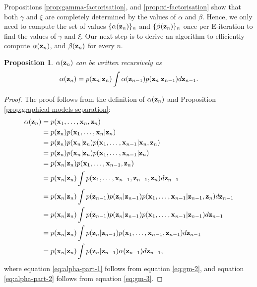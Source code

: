 \documentclass[12pt, oneside]{book}
\numberwithin{equation}{section}
\newcommand{\x}{{\bf x}}
\newcommand{\z}{{\bf z}}
\newtheorem{proposition}{Proposition}[section]
\begin{document}
{%
Propositions \ref{prop:gamma-factorisation}, and \ref{prop:xi-factorisation} show that both $\gamma$ and $\xi$ are completely determined by the values of $\alpha$ and $\beta$. Hence, we only need to compute the set of values $\{\alpha(\z_n)\}_n$ and $\{\beta(\z_n)\}_n$ once per E-iteration to find the values of $\gamma$ and $\xi$. Our next step is to derive an algorithm to efficiently compute $\alpha(\z_n)$, and $\beta(\z_n)$ for every $n$.


\begin{proposition} \label{prop:alpha-recursive}
	$\alpha(\z_n)$ can be written recursively as
	\begin{equation}
		\alpha(\z_n) = p(\x_n\vert \z_n) \int \alpha(\z_{n-1})p(\z_n\vert\z_{n-1}) d\z_{n-1}.
	\end{equation}
\end{proposition}

\begin{proof}
	The proof follows from the definition of $\alpha(\z_n)$ and Proposition \ref{prop:graphical-models-separation}:
	\begin{align}
		\alpha(\z_n) &= p(\x_1, \ldots, \x_n, \z_n) \\
		&= p(\z_n) p(\x_1, \ldots, \x_n \vert \z_n) \\
		&= p(\z_n) p(\x_n \vert \z_n) p(\x_1, \ldots, \x_{n-1} \vert \x_n, \z_n) \\
		&= p(\z_n) p(\x_n \vert \z_n) p(\x_1, \ldots, \x_{n-1} \vert \z_n) \label{eq:alpha-part-1}\\
		&= p(\x_n \vert \z_n) p(\x_1, \ldots, \x_{n-1}, \z_n) \\
		&= p(\x_n \vert \z_n) \int p(\x_1, \ldots, \x_{n-1}, \z_{n-1}, \z_n) d\z_{n-1}\\
		&= p(\x_n \vert \z_n) \int p(\z_{n-1})p(\z_n \vert \z_{n-1})p(\x_1, \ldots, \x_{n-1} \vert \z_{n-1}, \z_n) d\z_{n-1}\\
		&= p(\x_n \vert \z_n) \int p(\z_{n-1})p(\z_n \vert \z_{n-1})p(\x_1, \ldots, \x_{n-1} \vert \z_{n-1}) d\z_{n-1} \label{eq:alpha-part-2}\\ 
		&= p(\x_n \vert \z_n) \int p(\z_n \vert \z_{n-1})p(\x_1, \ldots, \x_{n-1}, \z_{n-1}) d\z_{n-1}\\
		&= p(\x_n \vert \z_n) \int p(\z_n \vert \z_{n-1})\alpha(\z_{n-1}) d\z_{n-1},
	\end{align}
	where equation \eqref{eq:alpha-part-1} follows from equation \eqref{eq:gm-2}, and equation \eqref{eq:alpha-part-2} follows from equation \eqref{eq:gm-3}.
\end{proof}

}
\end{document}
